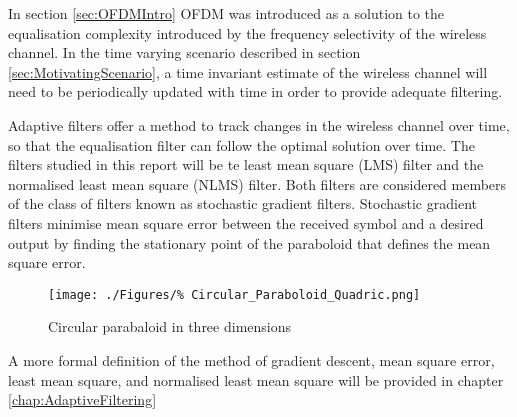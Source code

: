 In section \ref{sec:OFDMIntro} OFDM was introduced %
as a solution to the equalisation complexity introduced %
by the frequency selectivity of the wireless channel. In %
the time varying scenario described in section %
\ref{sec:MotivatingScenario}, a time invariant %
estimate of the wireless channel will need %
to be periodically updated with time in order %
to provide adequate filtering.

Adaptive filters offer a method to track changes in the %
wireless channel over time, so that the equalisation filter %
can follow the optimal solution over time. The filters %
studied in this report will be te least mean square (LMS) %
filter and the normalised least mean square (NLMS) filter. Both %
filters are considered members of the class of filters known %
as stochastic gradient filters. Stochastic gradient filters %
minimise mean square error between the received symbol %
and a desired output by finding the stationary point %
of the paraboloid that defines the mean square error.
\begin{figure}[ht]
	\centering
	\texttt{[image: ./Figures/\%
Circular\_Paraboloid\_Quadric.png]}
	\caption{Circular parabaloid in three dimensions 
	\cite{Paraboloid12}}
\end{figure}
A more formal definition of the method of gradient descent, %
mean square error, least mean square, and normalised least mean %
square will be provided in chapter \ref{chap:AdaptiveFiltering}
